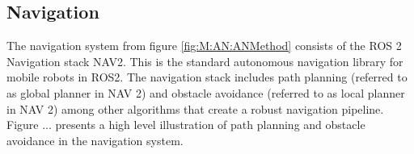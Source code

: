 


\subsection{Navigation} \label{sec:M:AN:Navigation}
The navigation system from figure \ref{fig:M:AN:ANMethod} consists of the ROS 2 Navigation stack NAV2. This is the standard autonomous navigation library for mobile robots in ROS2. The navigation stack includes path planning (referred to as global planner in NAV 2) and obstacle avoidance (referred to as local planner in NAV 2) among other algorithms that create a robust navigation pipeline. Figure ... presents a high level illustration of path planning and obstacle avoidance in the navigation system. 

